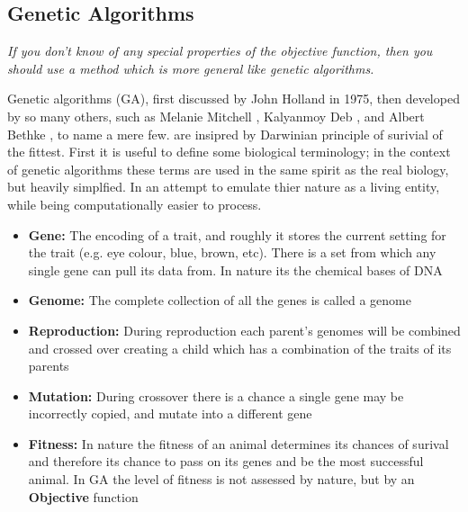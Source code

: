 \documentclass[12pt]{article}
\begin{document}
\subsection{Genetic Algorithms}

    \begin{displayquote} \textit {
        If you don't know of any special properties of the objective function, then you
        should use a method which is more general like genetic algorithms.
    } \end{displayquote}

    Genetic algorithms (GA), first 
    discussed by John Holland \cite{Holland} in 1975, then developed by so many
    others, such as Melanie Mitchell \cite{Mitchell}, Kalyanmoy Deb \cite{KalyanmoyDeb},
    and Albert Bethke \cite{Bethke}, to name a mere few. are insipred by Darwinian
    principle of surivial of the fittest.
    First it is useful to define some biological terminology; in the context of
    genetic algorithms these terms are used in the same spirit as the real biology,
    but heavily simplfied. In an attempt to emulate thier nature as a living entity,
    while being computationally easier to process.

    \begin{itemize}
        \item{\textbf{Gene:} The encoding of a trait, and roughly it stores the current
            setting for the trait (e.g. eye colour, blue, brown, etc). There is a set
            from which any single gene can pull its data from. In nature its the chemical
            bases  of DNA}
        \item{\textbf{Genome:} The complete collection of all the genes is called a
            genome}
        \item{\textbf{Reproduction:} During reproduction each parent's genomes will be
            combined and crossed over creating a child which has a combination of
            the traits of its parents}
        \item{\textbf{Mutation:} During crossover there is a chance a single gene
            may be incorrectly copied, and mutate into a different gene}
        \item{\textbf{Fitness: } In nature the fitness of an animal determines
            its chances of surival and therefore its chance to pass on its genes
            and be the most successful animal. In GA the level of fitness is not assessed
            by nature, but by an \textbf{Objective} function}
    \end{itemize}
\end{document}
